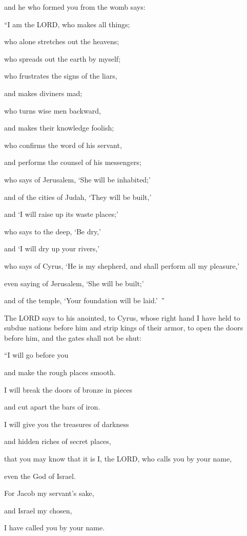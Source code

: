 and he who formed you from the womb says:

“I am the LORD, who makes all things;

who alone stretches out the heavens;

who spreads out the earth by myself;

\myverse{}who frustrates the signs of the liars,

and makes diviners mad;

who turns wise men backward,

and makes their knowledge foolish;

\myverse{}who confirms the word of his servant,

and performs the counsel of his messengers;

who says of Jerusalem, ‘She will be inhabited;’

and of the cities of Judah, ‘They will be built,’

and ‘I will raise up its waste places;’

\myverse{}who says to the deep, ‘Be dry,’

and ‘I will dry up your rivers,’

\myverse{}who says of Cyrus, ‘He is my shepherd, and shall perform all
my pleasure,’

even saying of Jerusalem, ‘She will be built;’

and of the temple, ‘Your foundation will be laid.’ ”


\mychapter{} \myverse*{}The LORD says to his anointed, to Cyrus, whose right hand I have
held to subdue nations before him and strip kings of their armor, to open the doors before him, and the
gates shall not be shut:

\myverse{}“I will go before you

and make the rough places smooth.

I will break the doors of bronze in pieces

and cut apart the bars of iron.

\myverse{}I will give you the treasures of darkness

and hidden riches of secret places,

that you may know that it is I, the LORD, who calls you by your name,

even the God of Israel.

\myverse{}For Jacob my servant’s sake,

and Israel my chosen,

I have called you by your name.

